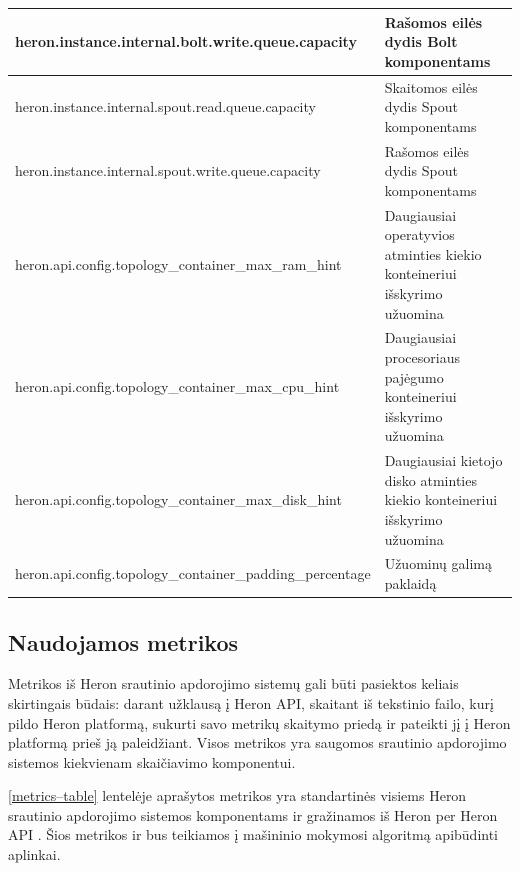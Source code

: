 \documentclass{VUMIFPSbakalaurinis}
\begin{document}
\begin{longtable}{|p{0.59\linewidth}|p{0.41\linewidth}|}
    heron.instance.internal.bolt.write.queue.capacity                     & Rašomos eilės dydis Bolt komponentams                                          \\ \hline
    heron.instance.internal.spout.read.queue.capacity                     & Skaitomos eilės dydis Spout komponentams                                       \\ \hline
    heron.instance.internal.spout.write.queue.capacity                    & Rašomos eilės dydis Spout komponentams                                         \\ \hline
    heron.api.config.topology\_container\_max\_ram\_hint                  & Daugiausiai operatyvios atminties kiekio konteineriui išskyrimo užuomina       \\ \hline
    heron.api.config.topology\_container\_max\_cpu\_hint                  & Daugiausiai procesoriaus pajėgumo konteineriui išskyrimo užuomina              \\ \hline
    heron.api.config.topology\_container\_max\_disk\_hint                 & Daugiausiai kietojo disko atminties kiekio konteineriui išskyrimo užuomina    \\ \hline
    heron.api.config.topology\_container\_padding\_percentage             & Užuominų galimą paklaidą                                                       \\ \hline
\end{longtable}

\subsection{Naudojamos metrikos}
Metrikos iš Heron srautinio apdorojimo sistemų gali būti pasiektos keliais skirtingais būdais: darant užklausą į Heron API, skaitant iš tekstinio failo, kurį pildo Heron platformą, sukurti savo metrikų skaitymo priedą ir pateikti jį į Heron platformą prieš ją paleidžiant. Visos metrikos yra saugomos srautinio apdorojimo sistemos kiekvienam skaičiavimo komponentui. 

\ref{metrics–table} lentelėje aprašytos metrikos yra standartinės visiems Heron srautinio apdorojimo sistemos komponentams ir gražinamos iš Heron per Heron API \cite{heronTracker}. Šios metrikos ir bus teikiamos į mašininio mokymosi algoritmą apibūdinti aplinkai.
\end{document}
